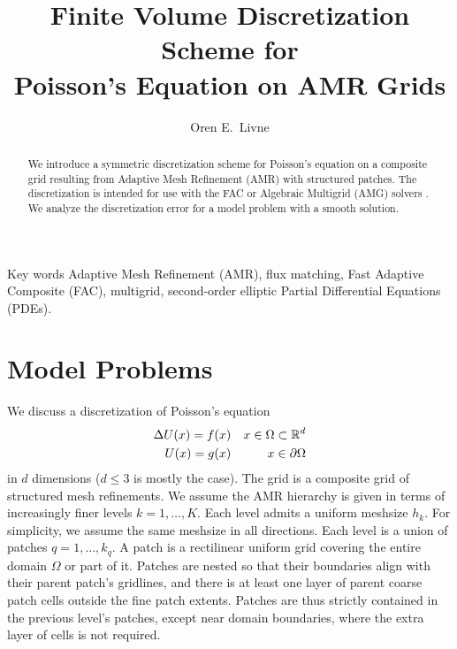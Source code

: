 \documentclass[12pt]{article}
\title{Finite Volume Discretization Scheme for \\
Poisson's Equation on AMR Grids}
\author{Oren E.~Livne \footnotemark[1]}
\makeatletter
\newcommand{\single }{\renewcommand{\baselinestretch}{1} \large \normalsize}
\newcommand{\double }{\renewcommand{\baselinestretch}{1.66} \large \normalsize}
\newcommand\keywordsname{Key words}
\newcommand\AMSname{AMS subject classifications}
\newenvironment{@abssec}[1]{%
     \if@twocolumn
       \section*{#1}%
     \else
       \vspace{.05in}\footnotesize
       \parindent .2in
         {\upshape\bfseries #1. }\ignorespaces
     \fi}
     {\if@twocolumn\else\par\vspace{.1in}\fi}
\newenvironment{keywords}{\begin{@abssec}{\keywordsname}}{\end{@abssec}}
\newenvironment{AMS}{\begin{@abssec}{\AMSname}}{\end{@abssec}}
\makeatother
\begin{document}
\def \myspace {\single}
\myspace

\maketitle

\renewcommand{\thefootnote}{\fnsymbol{footnote}}
\renewcommand{\thefootnote}{\arabic{footnote}}

\begin{abstract}
We introduce a symmetric discretization scheme for Poisson's equation on a
composite grid resulting from Adaptive Mesh Refinement (AMR) with structured
patches. The discretization is intended for use with the FAC
\cite{} or Algebraic Multigrid (AMG) solvers \cite{}. We analyze the
discretization error for a model problem with a smooth solution.
\end{abstract}

\begin{keywords}
Adaptive Mesh Refinement (AMR), flux matching, Fast Adaptive Composite
(FAC), multigrid, second-order elliptic Partial Differential Equations (PDEs).
\end{keywords}


\pagestyle{myheadings}
\thispagestyle{plain}



\section{Model Problems}
We discuss a discretization of Poisson's equation
\begin{eqnarray}
\Delta U(x) = f(x) &&  x \in \Omega \subset {\Bbb R}^d \\
U(x) = g(x) &&  x \in \partial \Omega
\end{eqnarray}
in $d$ dimensions ($d \leq 3$ is mostly the case). The grid is a composite
grid of structured mesh refinements. We assume the AMR
hierarchy is given in terms of increasingly finer
levels $k = 1,\ldots,K$. Each level admits a uniform meshsize $h_k$. For
simplicity, we assume the same meshsize in all directions. Each level
is a union of patches $q = 1,\ldots,k_q$. A patch is a rectilinear uniform
grid covering the entire domain $\Omega$ or part of it. Patches are nested
so that their boundaries align with their parent patch's gridlines, and there
is at least one layer of parent coarse patch cells
outside the fine patch extents. Patches are thus strictly contained in the
previous level's patches, except near domain boundaries, where the extra
layer of cells is not required.
\end{document}
